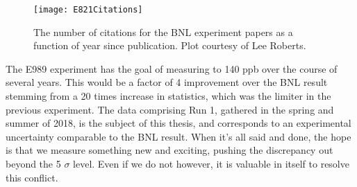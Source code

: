 \begin{figure}[]
	\centering
	\texttt{[image: E821Citations]}
	\caption[E821Citations]{The number of citations for the BNL experiment papers as a function of year since publication. Plot courtesy of Lee Roberts.}
	\label{fig:E821Citations}
\end{figure}


The E989 experiment has the goal of measuring \amu to 140 ppb over the course of several years. This would be a factor of 4 improvement over the BNL result stemming from a 20 times increase in statistics, which was the limiter in the previous experiment. The data comprising Run 1, gathered in the spring and summer of 2018, is the subject of this thesis, and corresponds to an experimental uncertainty comparable to the BNL result. When it's all said and done, the hope is that we measure something new and exciting, pushing the discrepancy out beyond the 5 $\sigma$ level. Even if we do not however, it is valuable in itself to resolve this conflict.
























